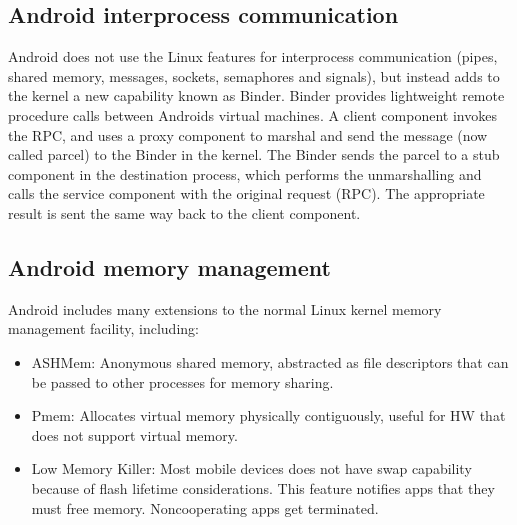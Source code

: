 \subsection{Android interprocess communication}
Android does not use the Linux features for interprocess communication (pipes, shared memory, messages, sockets, semaphores and signals), but instead adds to the kernel a new capability known as Binder. Binder provides lightweight remote procedure calls between Androids virtual machines. A client component invokes the RPC, and uses a proxy component to marshal and send the message (now called parcel) to the Binder in the kernel. The Binder sends the parcel to a stub component in the destination process, which performs the unmarshalling and calls the service component with the original request (RPC). The appropriate result is sent the same way back to the client component.

\subsection{Android memory management}
Android includes many extensions to the normal Linux kernel memory management facility, including:
\begin{itemize}
    \item ASHMem: Anonymous shared memory, abstracted as file descriptors that can be passed to other processes for memory sharing.
    \item Pmem: Allocates virtual memory physically contiguously, useful for HW that does not support virtual memory.
    \item Low Memory Killer: Most mobile devices does not have swap capability because of flash lifetime considerations. This feature notifies apps that they must free memory. Noncooperating apps get terminated.
\end{itemize}